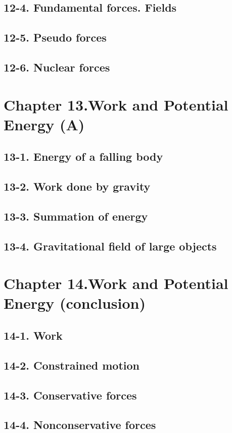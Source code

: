 \documentclass{article}
\begin{document}
\subsection{12-4. Fundamental forces. Fields}
\subsection{12-5. Pseudo forces}
\subsection{12-6. Nuclear forces}
\section{Chapter 13.Work and Potential Energy (A)}
\subsection{13-1. Energy of a falling body}
\subsection{13-2. Work done by gravity}
\subsection{13-3. Summation of energy}
\subsection{13-4. Gravitational field of large objects}
\section{Chapter 14.Work and Potential Energy (conclusion)}
\subsection{14-1. Work}
\subsection{14-2. Constrained motion}
\subsection{14-3. Conservative forces}
\subsection{14-4. Nonconservative forces}
\end{document}
